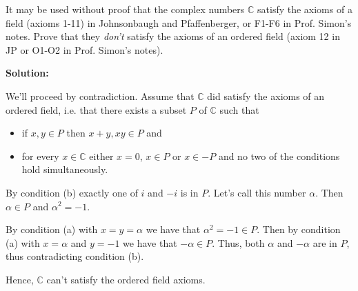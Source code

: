 \documentclass[12pt]{article}
\newcommand\bi{\begin{itemize}}
\newcommand\ei{\end{itemize}}
\newcommand\itema{\item[(a)]}
\newcommand\itemb{\item[(b)]}
\renewcommand\|{\ | \ }
\newcommand\C{\mathbb{C}}
\def\sol{\textbf{Solution:}}
\newcommand\textbook{Johnsonbaugh and Pfaffenberger}
\newcommand\notes{Prof. Simon's notes}
\begin{document}
It may be used without proof that the complex numbers $\C$ satisfy the axioms
of a field (axioms 1-11) in \textbook, or F1-F6 in \notes. Prove that they 
\emph{don't} satisfy the axioms of an
ordered field (axiom 12 in JP or O1-O2 in \notes).

\sol

We'll proceed by contradiction.
Assume that $\C$ did satisfy the axioms of an ordered field, i.e. that there
exists a subset $P$ of $\C$ such that 
\bi
\itema
if $x, y\in P$ then $x + y, xy \in P$ and
\itemb
for every $x\in \C$ either $x=0$, $x \in P$ or $x \in -P$ and no two of the
conditions hold simultaneously.
\ei

By condition (b) exactly one of $i$ and $-i$ is in $P$. Let's call this
number $\alpha$. Then $\alpha \in P$ and $\alpha^2 = -1$. 

By condition (a) with $x = y = \alpha$ we have that $\alpha^2 = -1 \in P$.
Then by condition (a) with $x = \alpha$ and $y = -1$ we have that 
$- \alpha \in P$. Thus, both $\alpha$ and $- \alpha$ are in $P$, thus
contradicting condition (b).

Hence, $\C$ can't satisfy the ordered field axioms.
\end{document}
